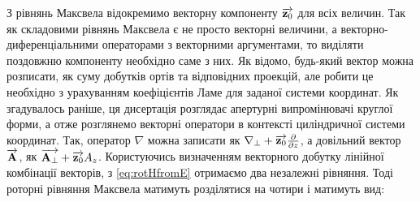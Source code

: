 

З рівнянь Максвела відокремимо векторну компоненту $ \overrightarrow{\mathbf z_0} $ для всіх 
величин. Так як складовими рівнянь Максвела є не просто векторні величини, а
векторно-диференціальними операторами з векторними аргументами, то виділяти 
поздовжню компоненту необхідно саме з них. Як відомо, будь-який вектор можна 
розписати, як суму добутків ортів та відповідних проекцій, але робити це 
необхідно з урахуванням коефіцієнтів Ламе \cite{imp:Korn1974} для заданої 
системи координат. Як згадувалось раніше, ця дисертація розглядає апертурні 
випромінювачі круглої форми, а отже розглянемо векторні оператори в контексті 
циліндричної системи координат. Так, оператор $ \nabla $ можна записати як 
$ \nabla_\perp + \overrightarrow{\mathbf z_0} \frac{\partial }{\partial z} $, а довільний вектор
$ \overrightarrow{\mathbf A} $, як $ \overrightarrow{\mathbf A_\perp} + \overrightarrow{\mathbf z_0} A_z $. Користуючись визначенням 
векторного добутку лінійної комбінації векторів, з \eqref{eq:rotHfromE} 
отримаємо два незалежні рівняння. Тоді роторні рівняння Максвела матимуть розділятися на чотири і матимуть вид:

